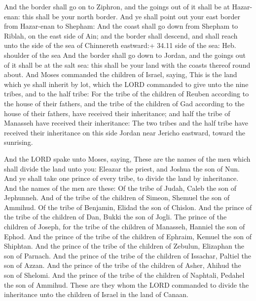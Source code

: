  And the border shall go on to Ziphron, and the goings out
of it shall be at Hazar-enan: this shall be your north border.
 And ye shall point out your east border from Hazar-enan to
Shepham:  And the coast shall go down from Shepham to
Riblah, on the east side of Ain; and the border shall descend, and shall
reach unto the side of the sea of Chinnereth eastward:+ 34.11 side of
the sea: Heb. shoulder of the sea  And the border shall go
down to Jordan, and the goings out of it shall be at the salt sea: this
shall be your land with the coasts thereof round about. 
And Moses commanded the children of Israel, saying, This is the land
which ye shall inherit by lot, which the LORD commanded to give unto the
nine tribes, and to the half tribe:  For the tribe of the
children of Reuben according to the house of their fathers, and the
tribe of the children of Gad according to the house of their fathers,
have received their inheritance; and half the tribe of Manasseh have
received their inheritance:  The two tribes and the half
tribe have received their inheritance on this side Jordan near Jericho
eastward, toward the sunrising.

 And the LORD spake unto Moses, saying,  These
are the names of the men which shall divide the land unto you: Eleazar
the priest, and Joshua the son of Nun.  And ye shall take
one prince of every tribe, to divide the land by inheritance.
 And the names of the men are these: Of the tribe of Judah,
Caleb the son of Jephunneh.  And of the tribe of the
children of Simeon, Shemuel the son of Ammihud.  Of the
tribe of Benjamin, Elidad the son of Chislon.  And the
prince of the tribe of the children of Dan, Bukki the son of Jogli.
 The prince of the children of Joseph, for the tribe of the
children of Manasseh, Hanniel the son of Ephod.  And the
prince of the tribe of the children of Ephraim, Kemuel the son of
Shiphtan.  And the prince of the tribe of the children of
Zebulun, Elizaphan the son of Parnach.  And the prince of
the tribe of the children of Issachar, Paltiel the son of Azzan.
 And the prince of the tribe of the children of Asher,
Ahihud the son of Shelomi.  And the prince of the tribe of
the children of Naphtali, Pedahel the son of Ammihud. 
These are they whom the LORD commanded to divide the inheritance unto
the children of Israel in the land of Canaan.

